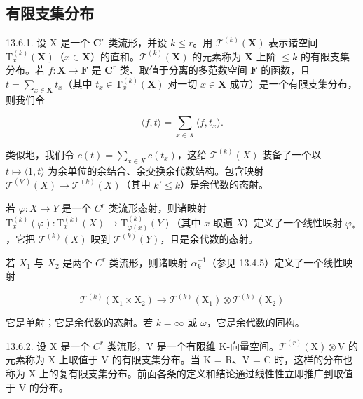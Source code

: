 \subsection{有限支集分布}

13.6.1. 设 X 是一个 \(\mathbf{C}^r\) 类流形，并设 \(k \leqslant r\)。用 \(\mathcal{T}^{(k)}(\mathbf{X})\) 表示诸空间 \(\mathrm{T}_x^{(k)}(\mathbf{X})\)（\(x \in \mathbf{X}\)）的直和。\(\mathcal{T}^{(k)}(\mathbf{X})\) 的元素称为 \(\mathbf{X}\) 上阶 \(\leqslant k\) 的有限支集分布。若 \(f: \mathbf{X} \to \mathbf{F}\) 是 \(\mathbf{C}^r\) 类、取值于分离的多范数空间 \(\mathbf{F}\) 的函数，且 \(t = \sum_{x \in \mathbf{X}} t_x\)（其中 \(t_x \in \mathrm{T}_x^{(k)}(\mathbf{X})\) 对一切 \(x \in \mathbf{X}\) 成立）是一个有限支集分布，则我们令

\[
\langle f, t \rangle = \sum_ {x \in X} \langle f, t _ {x} \rangle .
\]

类似地，我们令 \(c(t) = \sum_{x \in X} c(t_x)\)，这给 \(\mathcal{T}^{(k)}(X)\) 装备了一个以 \(t \mapsto \langle 1, t \rangle\) 为余单位的余结合、余交换余代数结构。包含映射 \(\mathcal{T}^{(k')}(X) \to \mathcal{T}^{(k)}(X)\)（其中 \(k' \leqslant k\)）是余代数的态射。

若 \(\varphi: X \to Y\) 是一个 \(C^r\) 类流形态射，则诸映射 \(\mathrm{T}_x^{(k)}(\varphi): \mathrm{T}_x^{(k)}(X) \to \mathrm{T}_{\varphi(x)}^{(k)}(Y)\)（其中 \(x\) 取遍 \(X\)）定义了一个线性映射 \(\varphi_*\)，它把 \(\mathcal{T}^{(k)}(X)\) 映到 \(\mathcal{T}^{(k)}(Y)\)，且是余代数的态射。

若 \(X_{1}\) 与 \(X_{2}\) 是两个 \(C^{r}\) 类流形，则诸映射 \(\alpha_{k}^{-1}\)（参见 13.4.5）定义了一个线性映射

\[
\mathcal {T} ^ {(k)} \left(\mathrm{X} _ {1} \times \mathrm{X} _ {2}\right)\rightarrow \mathcal {T} ^ {(k)} \left(\mathrm{X} _ {1}\right) \otimes \mathcal {T} ^ {(k)} \left(\mathrm{X} _ {2}\right)
\]

它是单射；它是余代数的态射。若 \(k = \infty\) 或 \(\omega\)，它是余代数的同构。

13.6.2. 设 X 是一个 \(C^{r}\) 类流形，V 是一个有限维 K-向量空间。\(\mathcal{T}^{(r)}(\mathrm{X})\otimes\mathrm{V}\) 的元素称为 X 上取值于 V 的有限支集分布。当 K = R、V = C 时，这样的分布也称为 X 上的复有限支集分布。前面各条的定义和结论通过线性性立即推广到取值于 V 的分布。

